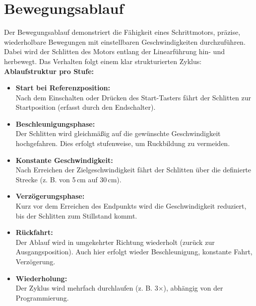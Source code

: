 \documentclass[a4paper,12pt]{report}
\begin{document}
\section{Bewegungsablauf}

\setlength{\leftskip}{1.5em} %

Der Bewegungsablauf demonstriert die Fähigkeit eines Schrittmotors, präzise, wiederholbare Bewegungen mit einstellbaren Geschwindigkeiten durchzuführen. Dabei wird der Schlitten des Motors entlang der Linearführung hin- und herbewegt. Das Verhalten folgt einem klar strukturierten Zyklus: \\[0.75cm]

\noindent\textbf{Ablaufstruktur pro Stufe:}

\begin{itemize}[leftmargin=1.5em, itemsep=1em, topsep=0.5em]
	\item \textbf{Start bei Referenzposition:} \\
	Nach dem Einschalten oder Drücken des Start-Tasters fährt der Schlitten zur Startposition (erfasst durch den Endschalter).
	
	\item \textbf{Beschleunigungsphase:} \\
	Der Schlitten wird gleichmäßig auf die gewünschte Geschwindigkeit hochgefahren. Dies erfolgt stufenweise, um Ruckbildung zu vermeiden.
	
	\item \textbf{Konstante Geschwindigkeit:} \\
	Nach Erreichen der Zielgeschwindigkeit fährt der Schlitten über die definierte Strecke (z. B. von 5\,cm auf 30\,cm).
	
	\item \textbf{Verzögerungsphase:} \\
	Kurz vor dem Erreichen des Endpunkts wird die Geschwindigkeit reduziert, bis der Schlitten zum Stillstand kommt.
	
	\item \textbf{Rückfahrt:} \\
	Der Ablauf wird in umgekehrter Richtung wiederholt (zurück zur Ausgangsposition). Auch hier erfolgt wieder Beschleunigung, konstante Fahrt, Verzögerung.
	
	\item \textbf{Wiederholung:} \\
	Der Zyklus wird mehrfach durchlaufen (z. B. 3×), abhängig von der Programmierung.
\end{itemize}
\end{document}
